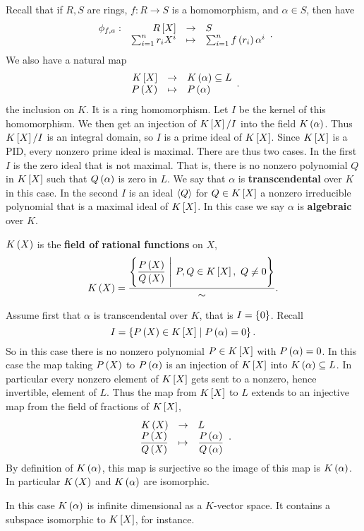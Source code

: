 Recall that if $ R, S $ are rings, $ f : R \to S $ is a homomorphism, and $ \alpha \in S $, then have
$$ \function[\phi_{f, a}]{R\sb{X}}{S}{\sum_{i = 1}^n r_iX^i}{\sum_{i = 1}^n f\rb{r_i}\alpha^i}. $$
We also have a natural map
$$ \function{K\sb{X}}{K\rb{\alpha} \subseteq L}{P\rb{X}}{P\rb{\alpha}}. $$
the inclusion on $ K $. It is a ring homomorphism. Let $ I $ be the kernel of this homomorphism. We then get an injection of $ K\sb{X} / I $ into the field $ K\rb{\alpha} $. Thus $ K\sb{X} / I $ is an integral domain, so $ I $ is a prime ideal of $ K\sb{X} $. Since $ K\sb{X} $ is a PID, every nonzero prime ideal is maximal. There are thus two cases. In the first $ I $ is the zero ideal that is not maximal. That is, there is no nonzero polynomial $ Q $ in $ K\sb{X} $ such that $ Q\rb{\alpha} $ is zero in $ L $. We say that $ \alpha $ is \textbf{transcendental} over $ K $ in this case. In the second $ I $ is an ideal $ \ab{Q} $ for $ Q \in K\sb{X} $ a nonzero irreducible polynomial that is a maximal ideal of $ K\sb{X} $. In this case we say $ \alpha $ is \textbf{algebraic} over $ K $.

\begin{definition}
$ K\rb{X} $ is the \textbf{field of rational functions} on $ X $,
$$ K\rb{X} = \dfrac{\cb{\dfrac{P\rb{X}}{Q\rb{X}} \ \Bigg| \ P, Q \in K\sb{X}, \ Q \ne 0}}{\sim}. $$
\end{definition}

\pagebreak

Assume first that $ \alpha $ is transcendental over $ K $, that is $ I = \cb{0} $. Recall
$$ I = \cb{P\rb{X} \in K\sb{X} \mid P\rb{\alpha} = 0}. $$
So in this case there is no nonzero polynomial $ P \in K\sb{X} $ with $ P\rb{\alpha} = 0 $. In this case the map taking $ P\rb{X} $ to $ P\rb{\alpha} $ is an injection of $ K\sb{X} $ into $ K\rb{\alpha} \subseteq L $. In particular every nonzero element of $ K\sb{X} $ gets sent to a nonzero, hence invertible, element of $ L $. Thus the map from $ K\sb{X} $ to $ L $ extends to an injective map from the field of fractions of $ K\sb{X} $,
$$ \function{K\rb{X}}{L}{\dfrac{P\rb{X}}{Q\rb{X}}}{\dfrac{P\rb{\alpha}}{Q\rb{\alpha}}}. $$
By definition of $ K\rb{\alpha} $, this map is surjective so the image of this map is $ K\rb{\alpha} $. In particular $ K\rb{X} $ and $ K\rb{\alpha} $ are isomorphic.

\begin{note*}
In this case $ K\rb{\alpha} $ is infinite dimensional as a $ K $-vector space. It contains a subspace isomorphic to $ K\sb{X} $, for instance.
\end{note*}

